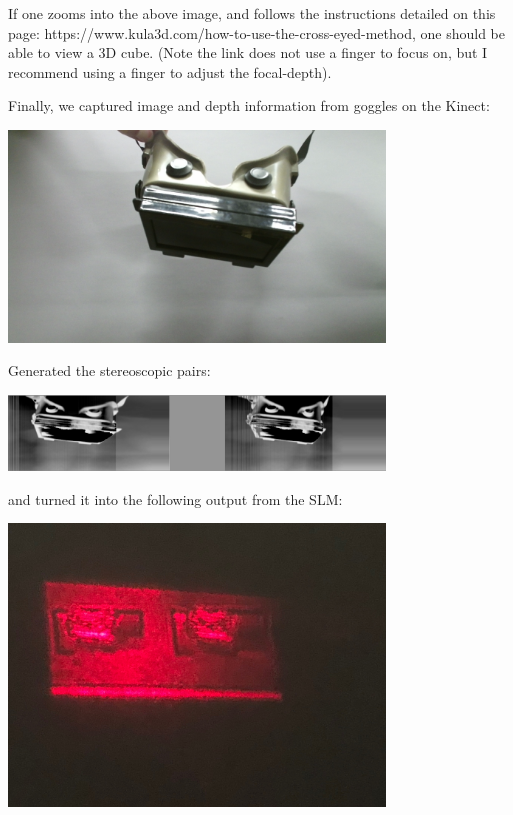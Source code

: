 \documentclass[12pt]{article}
\begin{document}
If one zooms into the above image, and follows the instructions detailed on this page: https://www.kula3d.com/how-to-use-the-cross-eyed-method, one should be able to view a 3D cube. (Note the link does not use a finger to focus on, but I recommend using a finger to adjust the focal-depth).

Finally, we captured image and depth information from goggles on the Kinect:

\begin{center}
\includegraphics[width=100mm]{goggles.png}
\end{center}

Generated the stereoscopic pairs:

\begin{center}
\includegraphics[width=100mm]{goggle_stereoscopic.png}
\end{center}

and turned it into the following output from the SLM:

\begin{center}
\includegraphics[width=100mm]{final_hologram.jpg}
\end{center}
\end{document}
